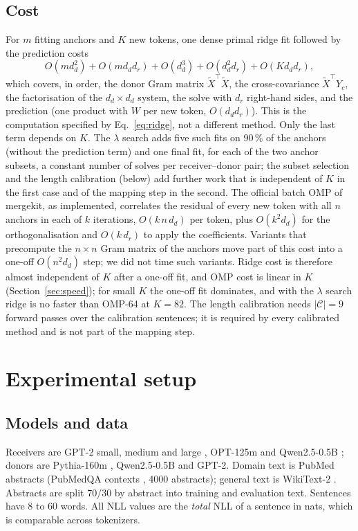 \documentclass[preprint,12pt]{elsarticle}
\begin{document}
\subsection{Cost}
For $m$ fitting anchors and $K$ new tokens, one dense primal ridge fit followed by the prediction costs
\begin{equation}
O(m d_d^2) + O(m d_d d_r) + O(d_d^3) + O(d_d^2 d_r) + O(K d_d d_r),
\end{equation}
which covers, in order, the donor Gram matrix $\tilde X^\top\tilde X$, the cross-covariance $\tilde X^\top Y_c$, the factorisation of the $d_d\times d_d$ system, the solve with $d_r$ right-hand sides, and the prediction (one product with $W$ per new token, $O(d_d d_r)$). This is the computation specified by Eq.~\eqref{eq:ridge}, not a different method. Only the last term depends on $K$. The $\lambda$ search adds five such fits on 90\,\% of the anchors (without the prediction term) and one final fit, for each of the two anchor subsets, a constant number of solves per receiver--donor pair; the subset selection and the length calibration (below) add further work that is independent of $K$ in the first case and of the mapping step in the second. The official batch OMP of mergekit, as implemented, correlates the residual of every new token with all $n$ anchors in each of $k$ iterations, $O(k\,n\,d_d)$ per token, plus $O(k^2 d_d)$ for the orthogonalisation and $O(k\,d_r)$ to apply the coefficients. Variants that precompute the $n\times n$ Gram matrix of the anchors move part of this cost into a one-off $O(n^2 d_d)$ step; we did not time such variants. Ridge cost is therefore almost independent of $K$ after a one-off fit, and OMP cost is linear in $K$ (Section~\ref{sec:speed}); for small $K$ the one-off fit dominates, and with the $\lambda$ search ridge is no faster than OMP-64 at $K=82$. The length calibration needs $|\mathcal C|=9$ forward passes over the calibration sentences; it is required by every calibrated method and is not part of the mapping step.

\section{Experimental setup}
\label{sec:setup}
\subsection{Models and data}
Receivers are GPT-2 small, medium and large \cite{radford2019gpt2}, OPT-125m \cite{zhang2022opt} and Qwen2.5-0.5B \cite{qwen2024qwen25}; donors are Pythia-160m \cite{biderman2023pythia}, Qwen2.5-0.5B and GPT-2. Domain text is PubMed abstracts (PubMedQA contexts \cite{jin2019pubmedqa}, 4000 abstracts); general text is WikiText-2 \cite{merity2017pointer}. Abstracts are split 70/30 by abstract into training and evaluation text. Sentences have 8 to 60 words. All NLL values are the \emph{total} NLL of a sentence in nats, which is comparable across tokenizers.
\end{document}
